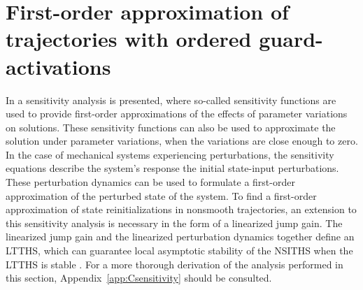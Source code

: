 \documentclass[../DC2017114Bouma.tex]{subfiles}
\begin{document}
\section{First-order approximation of trajectories with ordered guard-activations}
In \cite{Khalil1996} a sensitivity analysis is presented, where so-called sensitivity functions are used to provide first-order approximations of the effects of parameter variations on solutions. These sensitivity functions can also be used to approximate the solution under parameter variations, when the variations are close enough to zero. In the case of mechanical systems experiencing perturbations, the sensitivity equations describe the system's response the initial state-input perturbations. These perturbation dynamics can be used to formulate a first-order approximation of the perturbed state of the system. To find a first-order approximation of state reinitializations in nonsmooth trajectories, an extension to this sensitivity analysis is necessary in the form of a linearized jump gain. The linearized jump gain and the linearized perturbation dynamics together define an LTTHS, which can guarantee local asymptotic stability of the NSITHS when the LTTHS is stable \cite{Rijnen2017}. For a more thorough derivation of the analysis performed in this section, Appendix~\ref{app:Csensitivity} should be consulted.
\end{document}
